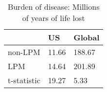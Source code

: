 \begin{table}[htbp]
\caption{\label{clabel} Burden of disease: Millions of years of life lost}\centering\medskip
\begin{tabular}{|l|l|l|}\hline  
 & US  & Global  \\ \hline  
non-LPM &     11.66 &    188.67 \\ \hline 
LPM &     14.64 &    201.89 \\ \hline 
t-statistic &     19.27 &      5.33 \\ \hline 
  \end{tabular}
\end{table}
